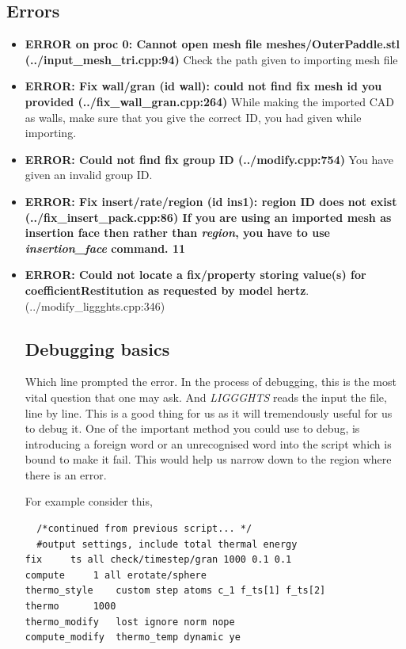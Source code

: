 \documentclass{tufte-book} %
\newcommand{\Li}{\textit{LIGGGHTS}\xspace}
\begin{document}
\subsection{Errors}
\begin{itemize}
\item \textbf{ERROR on proc 0: Cannot open mesh file meshes/OuterPaddle.stl (../input\_mesh\_tri.cpp:94)} Check the path given to importing mesh file
\item\textbf{ERROR: Fix wall/gran (id wall): could not find fix mesh id you provided (../fix\_wall\_gran.cpp:264)} While making the imported CAD as walls, make sure that you give the correct ID, you had given while importing.
\item \textbf{ERROR: Could not find fix group ID (../modify.cpp:754)} You have given an invalid group ID.
\item \textbf{ERROR: Fix insert/rate/region (id ins1): region ID does not exist (../fix\_insert\_pack.cpp:86) If you are using an imported mesh as insertion face then rather than \textit{region}, you have to use \textit{insertion\_face} command.
11
}
  \item \textbf{ERROR: Could not locate a fix/property storing value(s) for coefficientRestitution as requested by model hertz}. (../modify\_liggghts.cpp:346)
  
\subsection{Debugging basics}

Which line prompted the error. In the process of debugging, this is the most vital question that one may ask. And \Li reads the input the file, line by line. This is a good thing for us as it will tremendously useful for us to debug it. One of the important method you could use to debug, is introducing a foreign word or an unrecognised word into the script which is bound to make it fail. This would help us narrow down to the region where there is an error.

For example consider this,

\begin{verbatim}
  /*continued from previous script... */
  #output settings, include total thermal energy
fix		ts all check/timestep/gran 1000 0.1 0.1
compute		1 all erotate/sphere
thermo_style	custom step atoms c_1 f_ts[1] f_ts[2]  
thermo		1000
thermo_modify	lost ignore norm nope
compute_modify	thermo_temp dynamic ye
  \end{verbatim}
\end{itemize}
\end{document}
